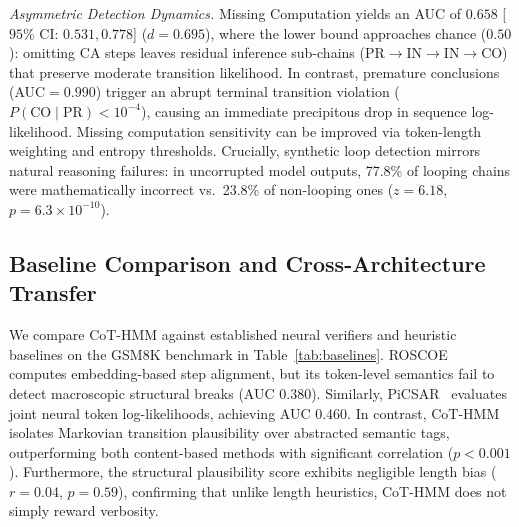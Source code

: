 \documentclass[conference]{IEEEtran}
\begin{document}
\textit{Asymmetric Detection Dynamics.} Missing Computation yields an AUC of $0.658$ [$95\%$ CI: $0.531, 0.778$] ($d=0.695$), where the lower bound approaches chance ($0.50$): omitting CA steps leaves residual inference sub-chains (PR$\rightarrow$IN$\rightarrow$IN$\rightarrow$CO) that preserve moderate transition likelihood. In contrast, premature conclusions (AUC$=0.990$) trigger an abrupt terminal transition violation ($P(\text{CO}\mid\text{PR}) < 10^{-4}$), causing an immediate precipitous drop in sequence log-likelihood. Missing computation sensitivity can be improved via token-length weighting and entropy thresholds. Crucially, synthetic loop detection mirrors natural reasoning failures: in uncorrupted model outputs, 77.8\% of looping chains were mathematically incorrect vs.\ 23.8\% of non-looping ones ($z=6.18$, $p=6.3\times 10^{-10}$).

\begin{table}[htbp]
\caption{Controlled Error Injection Results ($B=10,000$ bootstraps). Detection Rate (\%) is evaluated at the median score threshold of clean traces.}
\begin{center}
\label{tab:main_results}
\end{center}
\end{table}

\subsection{Baseline Comparison and Cross-Architecture Transfer}

We compare CoT-HMM against established neural verifiers and heuristic baselines on the GSM8K benchmark in Table~\ref{tab:baselines}. ROSCOE~\cite{golovneva2023roscoe} computes embedding-based step alignment, but its token-level semantics fail to detect macroscopic structural breaks (AUC $0.380$). Similarly, PiCSAR~\cite{picsar2025} evaluates joint neural token log-likelihoods, achieving AUC $0.460$. In contrast, CoT-HMM isolates Markovian transition plausibility over abstracted semantic tags, outperforming both content-based methods with significant correlation ($p < 0.001$). Furthermore, the structural plausibility score exhibits negligible length bias ($r=0.04$, $p=0.59$), confirming that unlike length heuristics, CoT-HMM does not simply reward verbosity.
\end{document}
